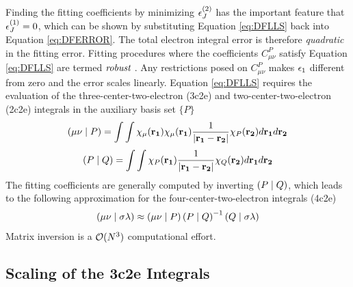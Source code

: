 \noindent Finding the fitting coefficients by minimizing $\epsilon_J^{(2)}$ has the important feature that $\epsilon_J^{(1)} = 0$, which can be shown by substituting Equation \ref{eq:DFLLS} back into Equation \ref{eq:DFERROR}. The total electron integral error is therefore \emph{quadratic} in the fitting error. Fitting procedures where the coefficients $C^P_{\mu\nu}$ satisfy Equation \ref{eq:DFLLS} are termed $\emph{robust}$ \cite{Dun2000}. Any restrictions posed on $C^P_{\mu\nu}$ makes $\epsilon_{1}$ different from zero and the error scales linearly. 
Equation \ref{eq:DFLLS} requires the evaluation of the three-center-two-electron (3c2e) and two-center-two-electron (2c2e) integrals in the auxiliary basis set $\{P\}$
\begin{equation}
\left( \mu\nu \mid P \right) = \int \int \chi_{\mu}(\mathbf{r_1}) \chi_{\mu}(\mathbf{r_1}) \frac{1}{\left\vert \mathbf{r_1} - \mathbf{r_2} \right\rvert} \chi_{P}(\mathbf{r_2}) d\mathbf{r_1} d\mathbf{r_2} 
\end{equation}
\begin{equation}
\left( P \mid Q \right) = \int \int \chi_{P}(\mathbf{r_1}) \frac{1}{\left\lvert \mathbf{r_1} - \mathbf{r_2} \right\rvert} \chi_{Q}(\mathbf{r_2}) d\mathbf{r_1} d\mathbf{r_2} 
\end{equation}
\noindent The fitting coefficients are generally computed by inverting $\left( P \mid Q \right)$, which leads to the following approximation for the four-center-two-electron integrals (4c2e)
\begin{equation}
\left( \mu\nu \mid \sigma\lambda \right) \approx \left( \mu\nu \mid P \right) \left( P \mid Q \right)^{-1} \left( Q \mid \sigma\lambda \right)
\end{equation}
\noindent Matrix inversion is a $\mathcal{O}(N^{3})$ computational effort. 

\subsection{Scaling of the 3c2e Integrals}

